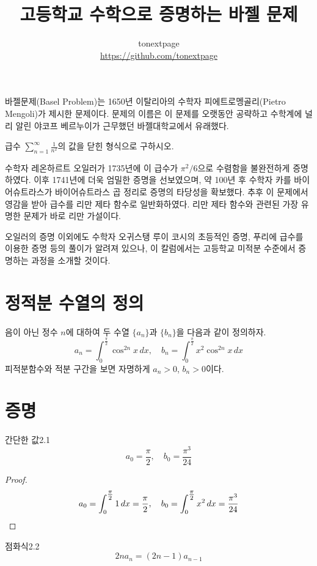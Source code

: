 \documentclass{article}
\title{고등학교 수학으로 증명하는 바젤 문제}
\author{tonextpage\\
    \url{https://github.com/tonextpage}
}
\date{}
\begin{document}
\maketitle

\noindent 바젤문제(Basel Problem)는 1650년 이탈리아의 수학자 피에트로멩골리(Pietro Mengoli)가 제시한 문제이다. 문제의 이름은 이 문제를 오랫동안 공략하고 수학계에 널리 알린 야코프 베르누이가 근무했던 바젤대학교에서 유래했다.
\begin{hint}[바젤 문제]
	\centering 급수 $\displaystyle\sum_{n=1}^\infty\frac{1}{n^2}$의 값을 닫힌 형식으로 구하시오.
\end{hint}

수학자 레온하르트 오일러가 1735년에 이 급수가 $\pi^2/6$으로 수렴함을 불완전하게 증명하였다. 이후 1741년에 더욱 엄밀한 증명을 선보였으며, 약 100년 후 수학자 카를 바이어슈트라스가 바이어슈트라스 곱 정리로 증명의 타당성을 확보했다. 추후 이 문제에서 영감을 받아 급수를 리만 제타 함수로 일반화하였다. 리만 제타 함수와 관련된 가장 유명한 문제가 바로 리만 가설이다.

오일러의 증명 이외에도 수학자 오귀스탱 루이 코시의 초등적인 증명, 푸리에 급수를 이용한 증명 등의 풀이가 알려져 있으나, 이 칼럼에서는 고등학교 미적분 수준에서 증명하는 과정을 소개할 것이다.

\section{정적분 수열의 정의}
음이 아닌 정수 $n$에 대하여 두 수열 $\{a_n\}$과 $\{b_n\}$을 다음과 같이 정의하자.
\[
	a_n=\int_0^{\tfrac{\pi}{2}}\cos^{2n}x\,dx,\quad b_n=\int_0^{\tfrac{\pi}{2}}x^2\cos^{2n}x\,dx
\]
피적분함수와 적분 구간을 보면 자명하게 $a_n>0$, $b_n>0$이다.

\section{증명}
\begin{thm}{간단한 값}{2.1}
	\[
		a_0=\frac{\pi}{2},\quad b_0=\frac{\pi^3}{24}
	\]
\end{thm}
\begin{proof}
	\[
		a_0=\int_0^{\tfrac{\pi}{2}}1\,dx=\frac{\pi}{2},\quad b_0=\int_0^{\tfrac{\pi}{2}}x^2\,dx=\frac{\pi^3}{24}\qedhere
	\]
\end{proof}

\begin{thm}{점화식}{2.2}
	\[
		2na_n=(2n-1)a_{n-1}
	\]
\end{thm}
\end{document}
